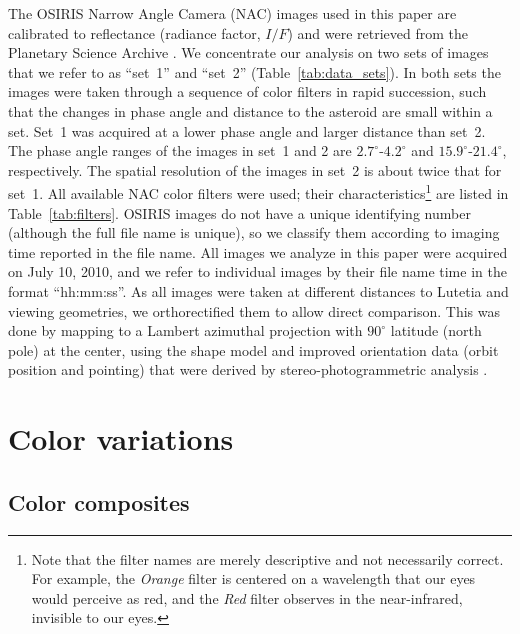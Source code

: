 \documentclass[3p,authoryear]{elsarticle}
\begin{document}
The OSIRIS Narrow Angle Camera (NAC) images used in this paper are calibrated to reflectance (radiance factor, $I/F$) and were retrieved from the Planetary Science Archive \citep{H11}. We concentrate our analysis on two sets of images that we refer to as ``set~1'' and ``set~2'' (Table~\ref{tab:data_sets}). In both sets the images were taken through a sequence of color filters in rapid succession, such that the changes in phase angle and distance to the asteroid are small within a set. Set~1 was acquired at a lower phase angle and larger distance than set~2. The phase angle ranges of the images in set~1 and 2 are $2.7^\circ$-$4.2^\circ$ and $15.9^\circ$-$21.4^\circ$, respectively. The spatial resolution of the images in set~2 is about twice that for set~1. All available NAC color filters were used; their characteristics\footnote{Note that the filter names are merely descriptive and not necessarily correct. For example, the {\it Orange} filter is centered on a wavelength that our eyes would perceive as red, and the {\it Red} filter observes in the near-infrared, invisible to our eyes.} are listed in Table~\ref{tab:filters}. OSIRIS images do not have a unique identifying number (although the full file name is unique), so we classify them according to imaging time reported in the file name. All images we analyze in this paper were acquired on July 10, 2010, and we refer to individual images by their file name time in the format ``hh:mm:ss''. As all images were taken at different distances to Lutetia and viewing geometries, we orthorectified them to allow direct comparison. This was done by mapping to a Lambert azimuthal projection with $90^\circ$ latitude (north pole) at the center, using the shape model and improved orientation data (orbit position and pointing) that were derived by stereo-photogrammetric analysis \citep{P12}.


\section{Color variations}


\subsection{Color composites}
\label{sec:color_composites}
\end{document}
